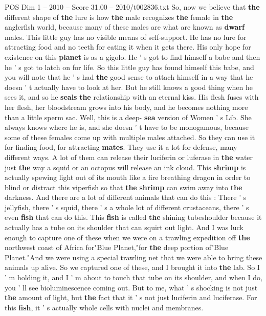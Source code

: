 \begin{textsample}{POS Dim 1 – 2010 – Score 31.00 – 2010/t002836.txt}
So, now we believe that \textbf{the} different shape of \textbf{the} lure is how \textbf{the} male recognizes \textbf{the} female in \textbf{the} anglerfish world, because many of these males are what are known as \textbf{dwarf} males.
This little guy has no visible means of self-support.
He has no lure for attracting food and no teeth for eating it when it gets there.
His only hope for existence on this \textbf{planet} is as a gigolo.
He ' s got to find himself a babe and then he ' s got to latch on for life.
So this little guy has found himself this babe, and you will note that he ' s had \textbf{the} good sense to attach himself in a way that he doesn ' t actually have to look at her.
But he still knows a good thing when he sees it, and so he \textbf{seals} \textbf{the} relationship with an eternal kiss.
His flesh fuses with her flesh, her bloodstream grows into his body, and he becomes nothing more than a little sperm sac.
Well, this is a deep- \textbf{sea} version of Women ' s Lib.
She always knows where he is, and she doesn ' t have to be monogamous, because some of these females come up with multiple males attached.
So they can use it for finding food, for attracting \textbf{mates}.
They use it a lot for defense, many different ways.
A lot of them can release their luciferin or luferase in \textbf{the} water just \textbf{the} way a squid or an octopus will release an ink cloud.
This \textbf{shrimp} is actually spewing light out of its mouth like a fire breathing dragon in order to blind or distract this viperfish so that \textbf{the} \textbf{shrimp} can swim away into \textbf{the} darkness.
And there are a lot of different animals that can do this : There ' s jellyfish, there ' s squid, there ' s a whole lot of different crustaceans, there ' s even \textbf{fish} that can do this.
This \textbf{fish} is called \textbf{the} shining tubeshoulder because it actually has a tube on its shoulder that can squirt out light.
And I was luck enough to capture one of these when we were on a trawling expedition off \textbf{the} northwest coast of Africa for"Blue Planet,"for \textbf{the} deep portion of"Blue Planet."And we were using a special trawling net that we were able to bring these animals up alive.
So we captured one of these, and I brought it into \textbf{the} lab.
So I ' m holding it, and I ' m about to touch that tube on its shoulder, and when I do, you ' ll see bioluminescence coming out.
But to me, what ' s shocking is not just \textbf{the} amount of light, but \textbf{the} fact that it ' s not just luciferin and luciferase.
For this \textbf{fish}, it ' s actually whole cells with nuclei and membranes.

\end{textsample}
